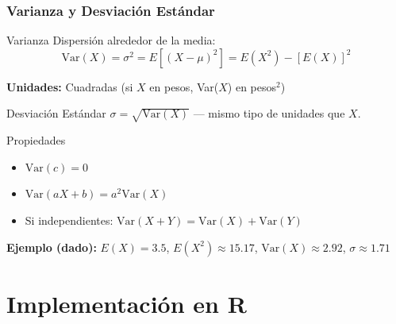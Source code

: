\documentclass[aspectratio=169,11pt]{beamer}
\begin{document}
\begin{frame}[fragile]
\frametitle{Varianza y Desviación Estándar}

\small

\begin{block}{Varianza}
Dispersión alrededor de la media:
$$\text{Var}(X) = \sigma^2 = E[(X - \mu)^2] = E(X^2) - [E(X)]^2$$
\end{block}

\pause
\vspace{-0.05cm}
\textbf{Unidades:} Cuadradas (si $X$ en pesos, Var($X$) en pesos$^2$)

\pause
\vspace{-0.05cm}
\begin{block}{Desviación Estándar}
$\sigma = \sqrt{\text{Var}(X)}$ — mismo tipo de unidades que $X$.
\end{block}

\pause
\vspace{-0.05cm}
\begin{block}{Propiedades}
\begin{itemize}\setlength{\itemsep}{0pt}
  \item $\text{Var}(c) = 0$
  \item $\text{Var}(aX + b) = a^2 \text{Var}(X)$
  \item Si independientes: $\text{Var}(X + Y) = \text{Var}(X) + \text{Var}(Y)$
\end{itemize}
\end{block}

\pause
\vspace{-0.05cm}
\textbf{Ejemplo (dado):} $E(X) = 3.5$, $E(X^2) \approx 15.17$, $\text{Var}(X) \approx 2.92$, $\sigma \approx 1.71$
\end{frame}

\section{Implementación en R}
\end{document}
